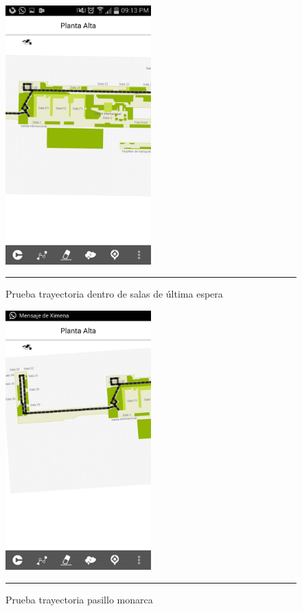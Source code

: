 \begin{figure}[h]
	\centering
		\includegraphics[width=0.5\textwidth]{Figuras/inter.png}
		\rule{30em}{0.5pt}
	\caption[Prueba trayectoria dentro de salas de última espera]{Prueba trayectoria dentro de salas de última espera}
	\label{fig:vistaPruebaSUES}
\end{figure}
\clearpage


\begin{figure}[h]
	\centering
		\includegraphics[width=0.5\textwidth]{Figuras/monarca.png}
		\rule{30em}{0.5pt}
	\caption[Prueba trayectoria pasillo monarca]{Prueba trayectoria pasillo monarca}
	\label{fig:vistaPruebaMonarca}
\end{figure}
\clearpage

